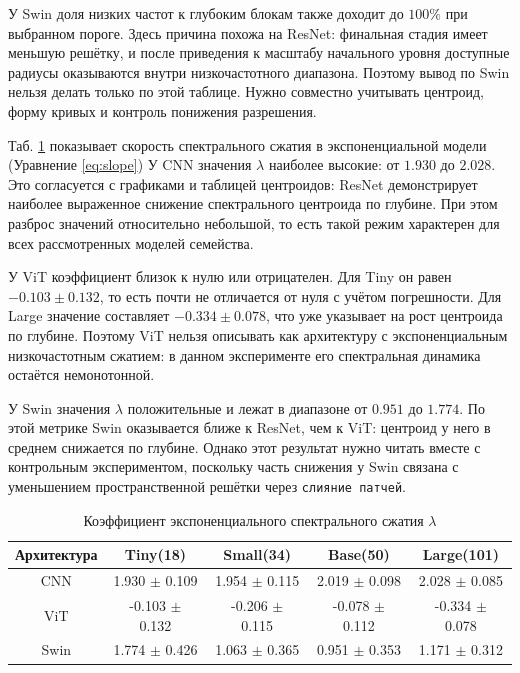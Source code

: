 У Swin доля низких частот к глубоким блокам также доходит до $100\%$ при выбранном пороге. Здесь причина похожа на ResNet: финальная стадия имеет меньшую решётку, и после приведения к масштабу начального уровня доступные радиусы оказываются внутри низкочастотного диапазона. Поэтому вывод по Swin нельзя делать только по этой таблице. Нужно совместно учитывать центроид, форму кривых и контроль понижения разрешения.

Таб. \ref{tab:models_metrics} показывает скорость спектрального сжатия в экспоненциальной модели (Уравнение \ref{eq:slope})  У CNN значения $\lambda$ наиболее высокие: от $1.930$ до $2.028$. Это согласуется с графиками и таблицей центроидов: ResNet демонстрирует наиболее выраженное снижение спектрального центроида по глубине. При этом разброс значений относительно небольшой, то есть такой режим характерен для всех рассмотренных моделей семейства.

У ViT коэффициент близок к нулю или отрицателен. Для Tiny он равен $-0.103 \pm 0.132$, то есть почти не отличается от нуля с учётом погрешности. Для Large значение составляет $-0.334 \pm 0.078$, что уже указывает на рост центроида по глубине. Поэтому ViT нельзя описывать как архитектуру с экспоненциальным низкочастотным сжатием: в данном эксперименте его спектральная динамика остаётся немонотонной.

У Swin значения $\lambda$ положительные и лежат в диапазоне от $0.951$ до $1.774$. По этой метрике Swin оказывается ближе к ResNet, чем к ViT: центроид у него в среднем снижается по глубине. Однако этот результат нужно читать вместе с контрольным экспериментом, поскольку часть снижения у Swin связана с уменьшением пространственной решётки через \texttt{слияние патчей}.

\begin{table}[h]
\centering
\caption{Коэффициент экспоненциального спектрального сжатия $\lambda$}
\label{tab:models_metrics}
\vspace{1ex}

\begin{tabular}{ccccc}
\toprule
\textbf{Архитектура} & \textbf{Tiny(18)} & \textbf{Small(34)} & \textbf{Base(50)} & \textbf{Large(101)} \\
\midrule
CNN & 1.930 $\pm$ 0.109 & 1.954 $\pm$ 0.115 & 2.019 $\pm$ 0.098 & 2.028 $\pm$ 0.085 \\
ViT & -0.103 $\pm$ 0.132 & -0.206 $\pm$ 0.115 & -0.078 $\pm$ 0.112 & -0.334 $\pm$ 0.078 \\
Swin & 1.774 $\pm$ 0.426 & 1.063 $\pm$ 0.365 & 0.951 $\pm$ 0.353 & 1.171 $\pm$ 0.312 \\
\bottomrule
\end{tabular}
\end{table}

